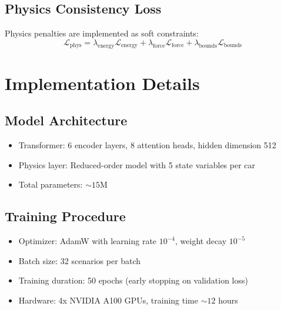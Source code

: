\subsection{Physics Consistency Loss}

Physics penalties are implemented as soft constraints:
\begin{equation}
    \mathcal{L}_{\text{phys}} = \lambda_{\text{energy}} \mathcal{L}_{\text{energy}} + \lambda_{\text{force}} \mathcal{L}_{\text{force}} + \lambda_{\text{bounds}} \mathcal{L}_{\text{bounds}}
    \label{eq:physics_loss}
\end{equation}


\section{Implementation Details}

\subsection{Model Architecture}

\begin{itemize}
    \item Transformer: 6 encoder layers, 8 attention heads, hidden dimension 512
    \item Physics layer: Reduced-order model with 5 state variables per car
    \item Total parameters: $\sim 15$M
\end{itemize}


\subsection{Training Procedure}

\begin{itemize}
    \item Optimizer: AdamW with learning rate $10^{-4}$, weight decay $10^{-5}$
    \item Batch size: 32 scenarios per batch
    \item Training duration: 50 epochs (early stopping on validation loss)
    \item Hardware: 4x NVIDIA A100 GPUs, training time $\sim 12$ hours
\end{itemize}

